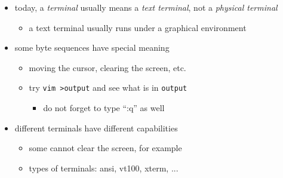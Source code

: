 \begin{itemize}
\item today, a \emph{terminal} usually means a \emph{text terminal}, not a
\emph{physical terminal}
\begin{itemize}
	\item a text terminal usually runs under a graphical environment
\end{itemize}

\item some byte sequences have special meaning
\begin{itemize}
	\item moving the cursor, clearing the screen, etc.
	\item try \texttt{vim >output} and see what is in \texttt{output}
	\begin{itemize}
		\item do not forget to type ``:q'' as well
	\end{itemize}
\end{itemize}

\item different terminals have different capabilities
\begin{itemize}
	\item some cannot clear the screen, for example
	\item types of terminals: ansi, vt100, xterm, ...
\end{itemize}
\end{itemize}

